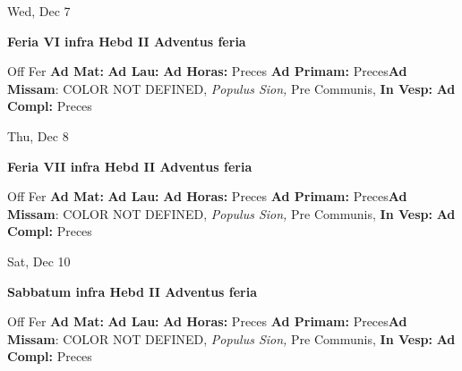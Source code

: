 \documentclass[10pt]{book}
\begin{document}
\begin{center}
\begin{minipage}{3.5in}
\vspace{2em}
\begin{center}Wed, Dec 7
\end{center}
\textbf{ \large Feria VI infra Hebd II Adventus
\textnormal{\normalsize feria}}

\begin{justify}Off Fer
\textbf{Ad Mat: }
\textbf{Ad Lau: }
\textbf{Ad Horas: }Preces
\textbf{Ad Primam: }Preces\textbf{Ad Missam}: COLOR NOT DEFINED, \textit{Populus Sion,} Pre Communis, 
\textbf{In Vesp: }
\textbf{Ad Compl: }Preces
\end{justify}
\end{minipage}
\end{center}

\begin{center}
\begin{minipage}{3.5in}
\vspace{2em}
\begin{center}Thu, Dec 8
\end{center}
\textbf{ \large Feria VII infra Hebd II Adventus
\textnormal{\normalsize feria}}

\begin{justify}Off Fer
\textbf{Ad Mat: }
\textbf{Ad Lau: }
\textbf{Ad Horas: }Preces
\textbf{Ad Primam: }Preces\textbf{Ad Missam}: COLOR NOT DEFINED, \textit{Populus Sion,} Pre Communis, 
\textbf{In Vesp: }
\textbf{Ad Compl: }Preces
\end{justify}
\end{minipage}
\end{center}

\begin{center}
\begin{minipage}{3.5in}
\vspace{2em}
\begin{center}Sat, Dec 10
\end{center}
\textbf{ \large Sabbatum infra Hebd II Adventus
\textnormal{\normalsize feria}}

\begin{justify}Off Fer
\textbf{Ad Mat: }
\textbf{Ad Lau: }
\textbf{Ad Horas: }Preces
\textbf{Ad Primam: }Preces\textbf{Ad Missam}: COLOR NOT DEFINED, \textit{Populus Sion,} Pre Communis, 
\textbf{In Vesp: }
\textbf{Ad Compl: }Preces
\end{justify}
\end{minipage}
\end{center}
\end{document}
